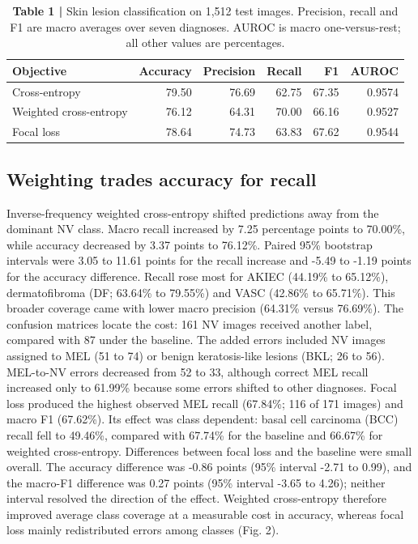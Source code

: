 \documentclass[11pt,a4paper]{article}
\begin{document}
\begin{table}[H]\centering\sffamily\footnotesize
\caption*{\textbf{Table 1 | }Skin lesion classification on 1,512 test images. Precision, recall and F1 are macro averages over seven diagnoses. AUROC is macro one-versus-rest; all other values are percentages.}
\setlength{\tabcolsep}{5pt}\renewcommand{\arraystretch}{1.18}
\begin{tabular}{lrrrrr}
\toprule
Objective & Accuracy & Precision & Recall & F1 & AUROC \\
\midrule
Cross-entropy & 79.50 & 76.69 & 62.75 & 67.35 & 0.9574 \\
Weighted cross-entropy & 76.12 & 64.31 & 70.00 & 66.16 & 0.9527 \\
Focal loss & 78.64 & 74.73 & 63.83 & 67.62 & 0.9544 \\
\bottomrule\end{tabular}\end{table}

\subsection*{Weighting trades accuracy for recall}

Inverse-frequency weighted cross-entropy shifted predictions away from the dominant NV class. Macro recall increased by 7.25 percentage points to 70.00\%, while accuracy decreased by 3.37 points to 76.12\%. Paired 95\% bootstrap intervals were 3.05 to 11.61 points for the recall increase and -5.49 to -1.19 points for the accuracy difference. Recall rose most for AKIEC (44.19\% to 65.12\%), dermatofibroma (DF; 63.64\% to 79.55\%) and VASC (42.86\% to 65.71\%). This broader coverage came with lower macro precision (64.31\% versus 76.69\%). The confusion matrices locate the cost: 161 NV images received another label, compared with 87 under the baseline. The added errors included NV images assigned to MEL (51 to 74) or benign keratosis-like lesions (BKL; 26 to 56). MEL-to-NV errors decreased from 52 to 33, although correct MEL recall increased only to 61.99\% because some errors shifted to other diagnoses. Focal loss produced the highest observed MEL recall (67.84\%; 116 of 171 images) and macro F1 (67.62\%). Its effect was class dependent: basal cell carcinoma (BCC) recall fell to 49.46\%, compared with 67.74\% for the baseline and 66.67\% for weighted cross-entropy. Differences between focal loss and the baseline were small overall. The accuracy difference was -0.86 points (95\% interval -2.71 to 0.99), and the macro-F1 difference was 0.27 points (95\% interval -3.65 to 4.26); neither interval resolved the direction of the effect. Weighted cross-entropy therefore improved average class coverage at a measurable cost in accuracy, whereas focal loss mainly redistributed errors among classes (Fig. 2).
\end{document}
